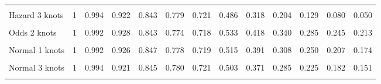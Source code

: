 \documentclass[
]{article}
\begin{document}
\begin{table}[H]
{\begin{tabular}[t]{lrrrrrrrrrrrr}
\cellcolor{gray!10}{Hazard 2 knots} & \cellcolor{gray!10}{1} & \cellcolor{gray!10}{0.992} & \cellcolor{gray!10}{0.928} & \cellcolor{gray!10}{0.843} & \cellcolor{gray!10}{0.774} & \cellcolor{gray!10}{0.719} & \cellcolor{gray!10}{0.523} & \cellcolor{gray!10}{0.384} & \cellcolor{gray!10}{0.284} & \cellcolor{gray!10}{0.210} & \cellcolor{gray!10}{0.156} & \cellcolor{gray!10}{0.116}\\
Hazard 3 knots & 1 & 0.994 & 0.922 & 0.843 & 0.779 & 0.721 & 0.486 & 0.318 & 0.204 & 0.129 & 0.080 & 0.050\\
\cellcolor{gray!10}{Odds 1 knots} & \cellcolor{gray!10}{1} & \cellcolor{gray!10}{0.992} & \cellcolor{gray!10}{0.927} & \cellcolor{gray!10}{0.843} & \cellcolor{gray!10}{0.774} & \cellcolor{gray!10}{0.718} & \cellcolor{gray!10}{0.532} & \cellcolor{gray!10}{0.415} & \cellcolor{gray!10}{0.338} & \cellcolor{gray!10}{0.283} & \cellcolor{gray!10}{0.242} & \cellcolor{gray!10}{0.211}\\
Odds 2 knots & 1 & 0.992 & 0.928 & 0.843 & 0.774 & 0.718 & 0.533 & 0.418 & 0.340 & 0.285 & 0.245 & 0.213\\
\cellcolor{gray!10}{Odds 3 knots} & \cellcolor{gray!10}{1} & \cellcolor{gray!10}{0.994} & \cellcolor{gray!10}{0.922} & \cellcolor{gray!10}{0.844} & \cellcolor{gray!10}{0.780} & \cellcolor{gray!10}{0.721} & \cellcolor{gray!10}{0.499} & \cellcolor{gray!10}{0.363} & \cellcolor{gray!10}{0.278} & \cellcolor{gray!10}{0.221} & \cellcolor{gray!10}{0.181} & \cellcolor{gray!10}{0.151}\\
Normal 1 knots & 1 & 0.992 & 0.926 & 0.847 & 0.778 & 0.719 & 0.515 & 0.391 & 0.308 & 0.250 & 0.207 & 0.174\\
\cellcolor{gray!10}{Normal 2 knots} & \cellcolor{gray!10}{1} & \cellcolor{gray!10}{0.992} & \cellcolor{gray!10}{0.929} & \cellcolor{gray!10}{0.843} & \cellcolor{gray!10}{0.773} & \cellcolor{gray!10}{0.718} & \cellcolor{gray!10}{0.537} & \cellcolor{gray!10}{0.425} & \cellcolor{gray!10}{0.349} & \cellcolor{gray!10}{0.293} & \cellcolor{gray!10}{0.251} & \cellcolor{gray!10}{0.219}\\
Normal 3 knots & 1 & 0.994 & 0.921 & 0.845 & 0.780 & 0.721 & 0.503 & 0.371 & 0.285 & 0.225 & 0.182 & 0.151\\
\cellcolor{gray!10}{Mixture cure Weibull} & \cellcolor{gray!10}{1} & \cellcolor{gray!10}{0.986} & \cellcolor{gray!10}{0.934} & \cellcolor{gray!10}{0.853} & \cellcolor{gray!10}{0.770} & \cellcolor{gray!10}{0.708} & \cellcolor{gray!10}{0.652} & \cellcolor{gray!10}{0.652} & \cellcolor{gray!10}{0.652} & \cellcolor{gray!10}{0.652} & \cellcolor{gray!10}{0.652} & \cellcolor{gray!10}{0.652}\\

\end{tabular}}
\end{table}
\end{document}
